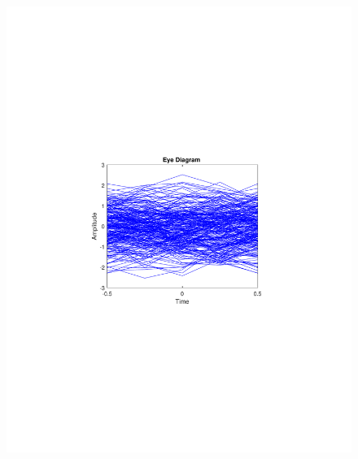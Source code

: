 \begin{refsection}
\begin{figure}[H]
\begin{minipage}{0.30\textwidth}
		\includegraphics[clip, trim=4cm 8cm 4cm 8cm, width=1\textwidth]{./sdf/m_qam_system/figures/expResults/homodyne/2_eye_16GBdInSig13dB_AfMF.pdf}
		\label{fig:16GBdSpecMF}
	\end{minipage}
	\begin{minipage}{0.30\textwidth}
		\centering

\end{minipage}
\end{figure}
\end{refsection}
